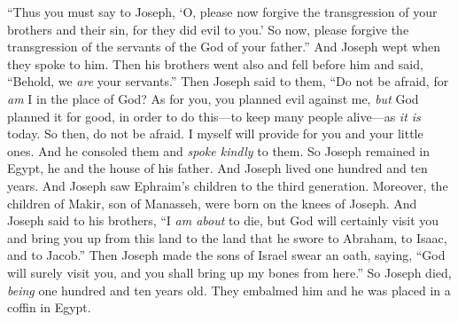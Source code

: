 \begin{biblechapter}
\verse “Thus you must say to Joseph, ‘O, please now forgive the transgression of your brothers and their sin, for they did evil to you.’ So now, please forgive the transgression of the servants of the God of your father.” And Joseph wept when they spoke to him.
\verse Then his brothers went also and fell before him and said, “Behold, we \textit{are} your servants.”
\verse Then Joseph said to them, “Do not be afraid, for \textit{am} I in the place of God?
\verse As for you, you planned evil against me, \textit{but} God planned it for good, in order to do this—to keep many people alive—as \textit{it is} today.
\verse So then, do not be afraid. I myself will provide for you and your little ones. And he consoled them and \textit{spoke kindly} to them.
 So Joseph remained in Egypt, he and the house of his father. And Joseph lived one hundred and ten years.
\verse And Joseph saw Ephraim’s children to the third generation. Moreover, the children of Makir, son of Manasseh, were born on the knees of Joseph.
\verse And Joseph said to his brothers, “I \textit{am about} to die, but God will certainly visit you and bring you up from this land to the land that he swore to Abraham, to Isaac, and to Jacob.”
\verse Then Joseph made the sons of Israel swear an oath, saying, “God will surely visit you, and you shall bring up my bones from here.”
\verse So Joseph died, \textit{being} one hundred and ten years old. They embalmed him and he was placed in a coffin in Egypt.
\end{biblechapter}

